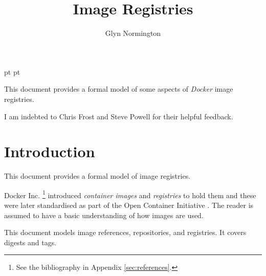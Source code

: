 \documentclass[a4paper,twoside,12pt]{article}
\begin{document}
 pt
 pt

\def\Slash{\slash\hspace{0pt}}

\title{Image Registries}

\author{Glyn Normington}

\maketitle
\thispagestyle{empty}
\setcounter{page}{1}


This document provides a formal model of some aspects of \textit{Docker} image registries.

I am indebted to Chris Frost and Steve Powell for their helpful feedback.


\newcommand{\true}{true}
\newcommand{\false}{false}
\renewcommand{\emptyset}{\varnothing}

\clearpage
\tableofcontents

\cleardoublepage
{}
\setcounter{page}{1}

\section{Introduction}

This document provides a formal model of image registries.

Docker Inc. \cite{docker}\footnote{See the bibliography in Appendix \ref{sec:references}.} introduced \textit{container images} and \textit{registries} to hold them and these were later standardised as part of the Open Container Initiative \cite{oci}. The reader is assumed to have a basic understanding of how images are used.

This document models image references, repositories, and registries. It covers digests and tags.
\end{document}
